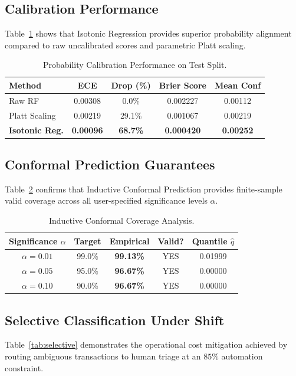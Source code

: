 \documentclass[10pt,a4paper,twocolumn]{article}
\begin{document}
\subsection{Calibration Performance}
Table~\ref{tab:calibration} shows that Isotonic Regression provides superior probability alignment compared to raw uncalibrated scores and parametric Platt scaling.

\begin{table}[htbp]
\centering
\caption{Probability Calibration Performance on Test Split.}
\label{tab:calibration}
\scriptsize
\begin{tabularx}{\columnwidth}{lcccc}
\toprule
\textbf{Method} & \textbf{ECE} & \textbf{Drop (\%)} & \textbf{Brier Score} & \textbf{Mean Conf} \\
\midrule
Raw RF & 0.00308 & 0.0\% & 0.002227 & 0.00112 \\
Platt Scaling & 0.00219 & 29.1\% & 0.001067 & 0.00219 \\
\textbf{Isotonic Reg.} & \textbf{0.00096} & \textbf{68.7\%} & \textbf{0.000420} & \textbf{0.00252} \\
\bottomrule
\end{tabularx}
\end{table}

\subsection{Conformal Prediction Guarantees}
Table~\ref{tab:conformal} confirms that Inductive Conformal Prediction provides finite-sample valid coverage across all user-specified significance levels $\alpha$.

\begin{table}[htbp]
\centering
\caption{Inductive Conformal Coverage Analysis.}
\label{tab:conformal}
\scriptsize
\begin{tabularx}{\columnwidth}{ccccc}
\toprule
\textbf{Significance $\alpha$} & \textbf{Target} & \textbf{Empirical} & \textbf{Valid?} & \textbf{Quantile $\hat{q}$} \\
\midrule
$\alpha = 0.01$ & 99.0\% & \textbf{99.13\%} & YES & 0.01999 \\
$\alpha = 0.05$ & 95.0\% & \textbf{96.67\%} & YES & 0.00000 \\
$\alpha = 0.10$ & 90.0\% & \textbf{96.67\%} & YES & 0.00000 \\
\bottomrule
\end{tabularx}
\end{table}

\subsection{Selective Classification Under Shift}
Table~\ref{tab:selective} demonstrates the operational cost mitigation achieved by routing ambiguous transactions to human triage at an $85\%$ automation constraint.
\end{document}
